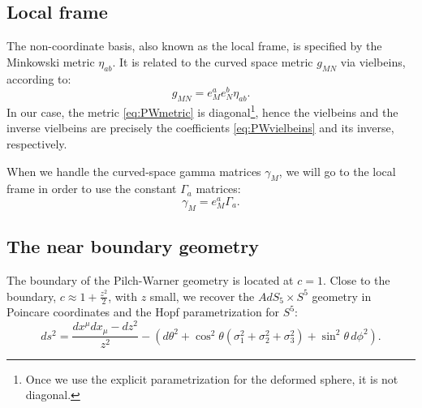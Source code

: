 \subsection{Local frame}\label{sec:localframe}
The non-coordinate basis, also known as the local frame, is specified by the Minkowski metric $\eta_{a b}$. It is related to the curved space metric $g_{M N}$ via vielbeins, according to:
\begin{equation*}
 g_{M N} = e^a_M e^b_N \eta_{a b}.
\end{equation*}
In our case, the metric \eqref{eq:PWmetric} is diagonal\footnote{Once we use the explicit parametrization for the deformed sphere, it is not diagonal.}, hence the vielbeins and the inverse vielbeins are precisely the coefficients \eqref{eq:PWvielbeins} and its inverse, respectively.

When we handle the curved-space gamma matrices $\gamma_{M}$, we will go to the local frame in order to use the constant $\Gamma_a$ matrices:
\begin{equation*}
 \gamma_{M} = e^a_M \Gamma_{a}.
\end{equation*}




\subsection{The near boundary geometry}

The boundary of the Pilch-Warner geometry is located at $c = 1$. 
Close to the boundary, $c \approx 1 + \frac{z^2}{2}$, with $z$ small, we recover the $AdS_5 \times S^5$ geometry in Poincare coordinates and the Hopf parametrization for $S^5$:
\begin{equation}\label{eq:AdS5xS5metric}
ds^2=\dfrac{dx^{\mu } dx_{\mu}-dz^2}{z^2}-\left(d\theta^2+\cos^2\theta \left(\sigma_1^2+\sigma_2^2+\sigma_3^2\right)+\sin^2\theta \,d\phi^2 \right).
\end{equation}
